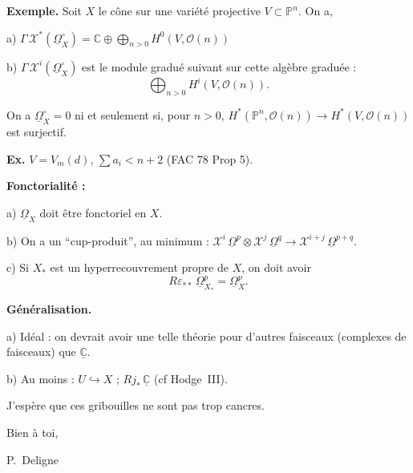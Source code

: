 \documentclass[11pt,a4paper]{article}
\theoremstyle{plain}
\theoremstyle{definition}
\begin{document}
\vspace{0.3cm}

\noindent\textbf{Exemple.} Soit $X$ le c\^one sur une vari\'et\'e projective $V \subset \mathbb{P}^{n}$. On a,

a) $\Gamma\, \mathcal{X}^{*}(\underline{\Omega}^{\circ}_{X}) = \mathbb{C} \oplus \displaystyle\bigoplus_{n > 0} H^{0}(V, \mathcal{O}(n))$

b) $\Gamma\, \mathcal{X}^{i}(\underline{\Omega}^{\circ}_{X})$ est le module gradu\'e suivant sur cette alg\`ebre gradu\'ee :
\[
\bigoplus_{n > 0} H^{i}(V, \mathcal{O}(n)).
\]

On a $\underline{\Omega}^{\circ}_{X} = 0$ ni et seulement si, pour $n > 0$, $H^{*}(\mathbb{P}^{n}, \mathcal{O}(n)) \to H^{*}(V, \mathcal{O}(n))$ est surjectif.

\noindent\textbf{Ex.} $V = V_{m}(d)$, $\sum a_{i} < n+2$ (FAC 78 Prop 5).

\vspace{0.5cm}

\noindent\textbf{Fonctorialit\'e :}

a) $\underline{\Omega}_{X}$ doit \^etre fonctoriel en $X$.

b) On a un ``cup-produit'', au minimum : $\mathcal{X}^{i}\,\underline{\Omega}^{p} \otimes \mathcal{X}^{j}\,\underline{\Omega}^{q} \to \mathcal{X}^{i+j}\,\underline{\Omega}^{p+q}$.

c) Si $X_{*}$ est un hyperrecouvrement propre de $X$, on doit avoir
\[
R\varepsilon_{**}\,\underline{\Omega}^{p}_{X_{*}} = \underline{\Omega}^{p}_{X}.
\]

\vspace{0.5cm}

\noindent\textbf{G\'en\'eralisation.}

a) Id\'eal : on devrait avoir une telle th\'eorie pour d'autres faisceaux (complexes de faisceaux) que $\underline{\mathbb{C}}$.

b) Au moins : $U \hookrightarrow X$ ; $Rj_{*}\,\underline{\mathbb{C}}$ \quad (cf Hodge~III).

\vspace{1cm}

\begin{center}
J'esp\`ere que ces gribouilles ne sont pas trop cancres.
\end{center}

\vspace{0.5cm}

Bien \`a toi,

\vspace{0.5cm}

\hspace{3cm} P.~Deligne
\end{document}
